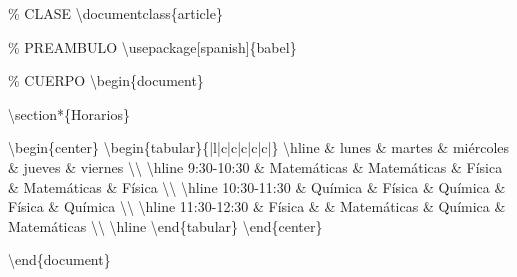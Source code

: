 \documentclass[
  a4paper,
]{scrreport}
\newenvironment{Shaded}{\begin{snugshade}}{\end{snugshade}}
\newcommand{\BuiltInTok}[1]{\textcolor[rgb]{0.00,0.23,0.31}{#1}}
\newcommand{\CommentTok}[1]{\textcolor[rgb]{0.37,0.37,0.37}{#1}}
\newcommand{\ExtensionTok}[1]{\textcolor[rgb]{0.00,0.23,0.31}{#1}}
\newcommand{\FunctionTok}[1]{\textcolor[rgb]{0.28,0.35,0.67}{#1}}
\newcommand{\KeywordTok}[1]{\textcolor[rgb]{0.00,0.23,0.31}{#1}}
\newcommand{\NormalTok}[1]{\textcolor[rgb]{0.00,0.23,0.31}{#1}}
\newcommand{\OperatorTok}[1]{\textcolor[rgb]{0.37,0.37,0.37}{#1}}
\theoremstyle{definition}
\theoremstyle{remark}
\begin{document}
\begin{tcolorbox}[enhanced jigsaw, left=2mm, colbacktitle=quarto-callout-tip-color!10!white, toprule=.15mm, coltitle=black, leftrule=.75mm, arc=.35mm, colback=white, opacitybacktitle=0.6, rightrule=.15mm, colframe=quarto-callout-tip-color-frame, title=\textcolor{quarto-callout-tip-color}{\faLightbulb}\hspace{0.5em}{Solución}, bottomrule=.15mm, breakable, opacityback=0, bottomtitle=1mm, toptitle=1mm, titlerule=0mm]

\begin{Shaded}
\begin{Highlighting}[]
\CommentTok{\% CLASE}
\BuiltInTok{\textbackslash{}documentclass}\NormalTok{\{}\ExtensionTok{article}\NormalTok{\}}

\CommentTok{\% PREAMBULO}
\BuiltInTok{\textbackslash{}usepackage}\NormalTok{[spanish]\{}\ExtensionTok{babel}\NormalTok{\}}

\CommentTok{\% CUERPO}
\KeywordTok{\textbackslash{}begin}\NormalTok{\{}\ExtensionTok{document}\NormalTok{\}}

\KeywordTok{\textbackslash{}section*}\NormalTok{\{Horarios\}}

\KeywordTok{\textbackslash{}begin}\NormalTok{\{}\ExtensionTok{center}\NormalTok{\}}
\KeywordTok{\textbackslash{}begin}\NormalTok{\{}\ExtensionTok{tabular}\NormalTok{\}\{|l|c|c|c|c|c|\}}
\FunctionTok{\textbackslash{}hline}
 \OperatorTok{\&}\NormalTok{ lunes }\OperatorTok{\&}\NormalTok{ martes }\OperatorTok{\&}\NormalTok{ miércoles }\OperatorTok{\&}\NormalTok{ jueves }\OperatorTok{\&}\NormalTok{ viernes }\FunctionTok{\textbackslash{}\textbackslash{}}
\FunctionTok{\textbackslash{}hline}
\NormalTok{9:30{-}10:30 }\OperatorTok{\&}\NormalTok{ Matemáticas }\OperatorTok{\&}\NormalTok{ Matemáticas }\OperatorTok{\&}\NormalTok{ Física }\OperatorTok{\&}\NormalTok{ Matemáticas }\OperatorTok{\&}\NormalTok{ Física }\FunctionTok{\textbackslash{}\textbackslash{}}
\FunctionTok{\textbackslash{}hline}
\NormalTok{10:30{-}11:30 }\OperatorTok{\&}\NormalTok{ Química }\OperatorTok{\&}\NormalTok{ Física }\OperatorTok{\&}\NormalTok{ Química }\OperatorTok{\&}\NormalTok{ Física }\OperatorTok{\&}\NormalTok{ Química }\FunctionTok{\textbackslash{}\textbackslash{}}
\FunctionTok{\textbackslash{}hline}
\NormalTok{11:30{-}12:30 }\OperatorTok{\&}\NormalTok{ Física }\OperatorTok{\&} \OperatorTok{\&}\NormalTok{ Matemáticas }\OperatorTok{\&}\NormalTok{ Química }\OperatorTok{\&}\NormalTok{ Matemáticas }\FunctionTok{\textbackslash{}\textbackslash{}}
\FunctionTok{\textbackslash{}hline}
\KeywordTok{\textbackslash{}end}\NormalTok{\{}\ExtensionTok{tabular}\NormalTok{\}}
\KeywordTok{\textbackslash{}end}\NormalTok{\{}\ExtensionTok{center}\NormalTok{\}}

\KeywordTok{\textbackslash{}end}\NormalTok{\{}\ExtensionTok{document}\NormalTok{\}}
\end{Highlighting}
\end{Shaded}

\end{tcolorbox}
\end{document}
